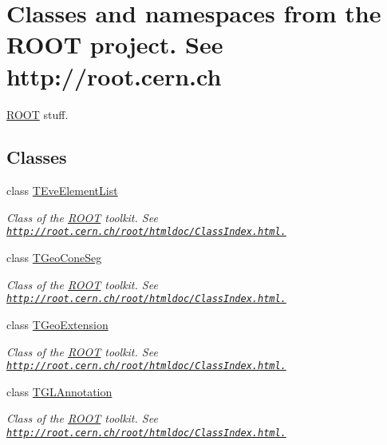 \hypertarget{group___r_o_o_t}{
\section{Classes and namespaces from the ROOT project. See http://root.cern.ch}
\label{group___r_o_o_t}
}


\hyperlink{namespace_r_o_o_t}{ROOT} stuff.  
\subsection*{Classes}
\begin{DoxyCompactItemize}
\item 
class \hyperlink{class_t_eve_element_list}{TEveElementList}
\begin{DoxyCompactList}\small\item\em Class of the \hyperlink{namespace_r_o_o_t}{ROOT} toolkit. See \href{http://root.cern.ch/root/htmldoc/ClassIndex.html.}{\tt http://root.cern.ch/root/htmldoc/ClassIndex.html.} \item\end{DoxyCompactList}\item 
class \hyperlink{class_t_geo_cone_seg}{TGeoConeSeg}
\begin{DoxyCompactList}\small\item\em Class of the \hyperlink{namespace_r_o_o_t}{ROOT} toolkit. See \href{http://root.cern.ch/root/htmldoc/ClassIndex.html.}{\tt http://root.cern.ch/root/htmldoc/ClassIndex.html.} \item\end{DoxyCompactList}\item 
class \hyperlink{class_t_geo_extension}{TGeoExtension}
\begin{DoxyCompactList}\small\item\em Class of the \hyperlink{namespace_r_o_o_t}{ROOT} toolkit. See \href{http://root.cern.ch/root/htmldoc/ClassIndex.html.}{\tt http://root.cern.ch/root/htmldoc/ClassIndex.html.} \item\end{DoxyCompactList}\item 
class \hyperlink{class_t_g_l_annotation}{TGLAnnotation}
\begin{DoxyCompactList}\small\item\em Class of the \hyperlink{namespace_r_o_o_t}{ROOT} toolkit. See \href{http://root.cern.ch/root/htmldoc/ClassIndex.html.}{\tt http://root.cern.ch/root/htmldoc/ClassIndex.html.} \item\end{DoxyCompactList}\item 

\end{DoxyCompactItemize}
